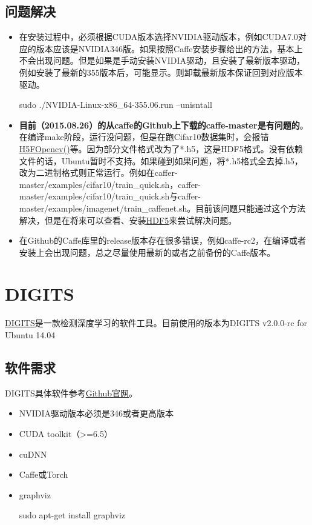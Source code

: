 \subsection{问题解决}
\begin{itemize}
\item 在安装过程中，必须根据CUDA版本选择NVIDIA驱动版本，例如CUDA7.0对应的版本应该是NVIDIA346版。如果按照Caffe安装步骤给出的方法，基本上不会出现问题。但是如果是手动安装NVIDIA驱动，且安装了最新版本驱动，例如安装了最新的355版本后，可能显示{\color{blue}{no CUDA-capable device is detected}}。则卸载最新版本保证回到对应版本驱动。
\begin{bash}
sudo ./NVIDIA-Linux-x86_64-355.06.run --unisntall
\end{bash}
\item \textbf{目前（2015.08.26）的从caffe的Github上下载的caffe-master是有问题的}。在编译make阶段，运行没问题，但是在跑Cifar10数据集时，会报错\underline{H5FOpencv()}等。因为部分文件格式改为了*.h5，这是HDF5格式。没有依赖文件的话，Ubuntu暂时不支持。如果碰到如果问题，将*.h5格式全去掉.h5，改为二进制格式则正常运行。例如在caffer-master/examples/cifar10/train\_quick.sh，caffer-master/examples/cifar10/train\_quick.sh与caffer-master/examples/imagenet/train\_caffenet.sh。目前该问题只能通过这个方法解决，但是在将来可以查看、安装\href{https://github.com/live-clones/hdf5}{HDF5}来尝试解决问题。
\item 在Github的Caffe库里的release版本存在很多错误，例如caffe-rc2，在编译或者安装上会出现问题，总之尽量使用最新的或者之前备份的Caffe版本。
\end{itemize}

\section{DIGITS}
\href{http://devblogs.nvidia.com/parallelforall/digits-deep-learning-gpu-training-system/}{DIGITS}是一款检测深度学习的软件工具。目前使用的版本为DIGITS v2.0.0-rc for Ubuntu 14.04
\subsection{软件需求}
DIGITS具体软件参考\href{https://github.com/NVIDIA/DIGITS}{Github官网}。
\begin{itemize}
\item NVIDIA驱动版本必须是346或者更高版本
\item CUDA toolkit（>=6.5）
\item cuDNN
\item Caffe或Torch
\item graphviz
\begin{bash}
sudo apt-get install graphviz
\end{bash}
\end{itemize}


